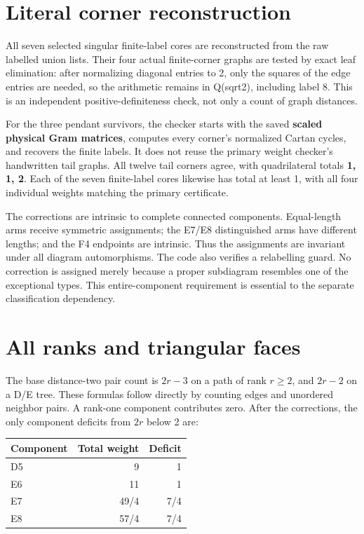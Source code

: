 \documentclass[
  10pt,
]{report}
\newcounter{none} %
\begin{document}
\section{Literal corner
reconstruction}\label{literal-corner-reconstruction}

All seven selected singular finite-label cores are reconstructed from
the raw labelled union lists. Their four actual finite-corner graphs are
tested by exact leaf elimination: after normalizing diagonal entries to
2, only the squares of the edge entries are needed, so the arithmetic
remains in Q(sqrt2), including label 8. This is an independent
positive-definiteness check, not only a count of graph distances.

For the three pendant survivors, the checker starts with the saved
\textbf{scaled physical Gram matrices}, computes every corner's
normalized Cartan cycles, and recovers the finite labels. It does not
reuse the primary weight checker's handwritten tail graphs. All twelve
tail corners agree, with quadrilateral totals \textbf{1, 1, 2}. Each of
the seven finite-label cores likewise has total at least 1, with all
four individual weights matching the primary certificate.

The corrections are intrinsic to complete connected components.
Equal-length arms receive symmetric assignments; the E7/E8 distinguished
arms have different lengths; and the F4 endpoints are intrinsic. Thus
the assignments are invariant under all diagram automorphisms. The code
also verifies a relabelling guard. No correction is assigned merely
because a proper subdiagram resembles one of the exceptional types. This
entire-component requirement is essential to the separate classification
dependency.

\section{All ranks and triangular
faces}\label{all-ranks-and-triangular-faces}

The base distance-two pair count is \(2r-3\) on a path of rank
\(r\ge2\), and \(2r-2\) on a D/E tree. These formulas follow directly by
counting edges and unordered neighbor pairs. A rank-one component
contributes zero. After the corrections, the only component deficits
from \(2r\) below 2 are:

{\def\LTcaptype{none} %
\begin{longtable}[]{@{}lrr@{}}
\toprule\noalign{}
Component & Total weight & Deficit \\
\midrule\noalign{}
\endhead
\bottomrule\noalign{}
\endlastfoot
D5 & 9 & 1 \\
E6 & 11 & 1 \\
E7 & 49/4 & 7/4 \\
E8 & 57/4 & 7/4 \\
\end{longtable}
}
\end{document}
